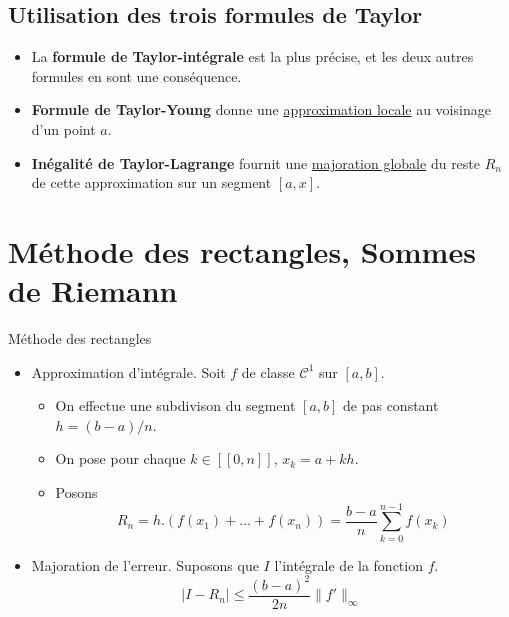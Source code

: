 \subsection{Utilisation des trois formules de Taylor} %

\begin{itemize}

    \item La \textbf{formule de Taylor-intégrale} est la plus précise, et les deux autres formules en sont une conséquence. 
    \item \textbf{Formule de Taylor-Young} donne une \underline{approximation locale} au voisinage d'un point $a$. 
    \item \textbf{Inégalité de Taylor-Lagrange} fournit une \underline{majoration globale} du reste $R_n$ de cette approximation sur un segment $[a,x]$.

\end{itemize}
\section{Méthode des rectangles, Sommes de Riemann} %
\label{sec:Méthode des rectangles, Sommes de Riemann}

\begin{Theorem}{Méthode des rectangles}{}
\begin{itemize}

  \item Approximation d'intégrale. Soit $f$ de classe $\mathscr{C} ^{1}$ sur $[a,b]$. 
    \begin{itemize}

        \item On effectue une subdivison du segment $[a,b]$ de pas constant $h = (b-a) / n$. 

      \item On pose pour chaque $k \in [\![0, n]\!]$, $x_k = a + kh$. 
      \item Posons 
        \begin{equation}
          R_n = h.(f(x_1) + \dots + f(x_n)) = \frac{b-a}{n}  \sum_{k=0}^{n-1} f(x_k)
        \end{equation}

    \end{itemize}

  \item Majoration de l'erreur.  Suposons que $I$ l'intégrale de la fonction $f$.
    \begin{equation}
      |I - R_n| \le \frac{(b-a) ^{2}}{2n} \| f' \| _{\infty}
    \end{equation}

\end{itemize}
\end{Theorem}


